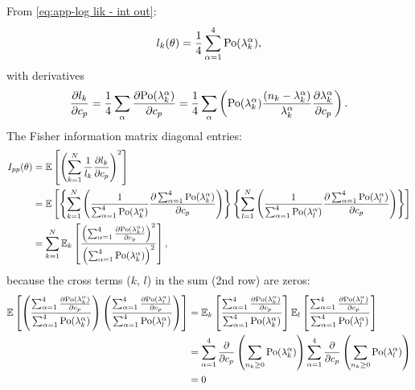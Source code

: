 From \autoref{eq:app-log lik - int out}:
%
\begin{equation}
	l_k(\theta)=\frac{1}{4}\sum_{\alpha=1}^4\mathrm{Po}(\lambda_k^\alpha),
\end{equation}
%
with derivatives 
%
\begin{equation}
	\frac{\partial l_k}{\partial c_p}=\frac{1}{4}\sum_\alpha\frac{\partial\mathrm{Po}(\lambda_k^\alpha)}{\partial c_p}=\frac{1}{4}\sum_\alpha\left(\mathrm{Po}(\lambda_k^\alpha)\frac{(n_k-\lambda_k^\alpha)}{\lambda_k^\alpha}\frac{\partial\lambda_k^\alpha}{\partial c_p}\right).
\end{equation}
%
The Fisher information matrix diagonal entries:
%
\begin{alignat}{2}
	I_{pp}(\theta) & =\mathbb{E}\left[\left(\sum_{k=1}^N\frac{1}{l_k}\frac{\partial l_k}{\partial c_p}\right)^2\right]\nonumber \\
 	& =\mathbb{E}\left[\left\{ \sum_{k=1}^N\left(\frac{1}{\sum_{\alpha=1}^4\mathrm{Po}(\lambda_k^\alpha)}\frac{\partial\sum_{\alpha=1}^4\mathrm{Po}(\lambda_k^\alpha)}{\partial c_p}\right)\right\} \left\{ \sum_{l=1}^N\left(\frac{1}{\sum_{\alpha=1}^4\mathrm{Po}(\lambda_l^\alpha)}\frac{\partial\sum_{\alpha=1}^4\mathrm{Po}(\lambda_l^\alpha)}{\partial c_p}\right)\right\} \right]\nonumber \\
	& =\sum_{k=1}^N\mathbb{E}_k\left[\frac{\left(\sum_{\alpha=1}^4\frac{\partial\mathrm{Po}(\lambda_k^\alpha)}{\partial c_p}\right)^2}{\left(\sum_{\alpha=1}^4\mathrm{Po}(\lambda_k^\alpha)\right)^2}\right],
	\label{eq:app-Fisher Info Integrated Out - diagonal entries}
\end{alignat}
%
because the cross terms ($k,\, l$) in the sum (2nd row) are zeros: 
%
\begin{alignat*}{2}
	\mathbb{E}\left[\left(\frac{\sum_{\alpha=1}^4\frac{\partial\mathrm{Po}(\lambda_k^\alpha)}{\partial c_p}}{\sum_{\alpha=1}^4\mathrm{Po}(\lambda_k^\alpha)}\right)\left(\frac{\sum_{\alpha=1}^4\frac{\partial\mathrm{Po}(\lambda_l^\alpha)}{\partial c_p}}{\sum_{\alpha=1}^4\mathrm{Po}(\lambda_l^\alpha)}\right)\right] 
	& =\mathbb{E}_k\left[\frac{\sum_{\alpha=1}^4\frac{\partial\mathrm{Po}(\lambda_k^\alpha)}{\partial c_p}}{\sum_{\alpha=1}^4\mathrm{Po}(\lambda_k^\alpha)}\right]\mathbb{E}_l\left[\frac{\sum_{\alpha=1}^4\frac{\partial\mathrm{Po}(\lambda_l^\alpha)}{\partial c_p}}{\sum_{\alpha=1}^4\mathrm{Po}(\lambda_l^\alpha)}\right]\\
 	& =\sum_{\alpha=1}^4\frac{\partial}{\partial c_p}\left(\sum_{n_k\geq0}\mathrm{Po}(\lambda_k^\alpha)\right)\sum_{\alpha=1}^4\frac{\partial}{\partial c_p}\left(\sum_{n_k\geq0}\mathrm{Po}(\lambda_l^\alpha)\right)\\
 	& =0
\end{alignat*}

